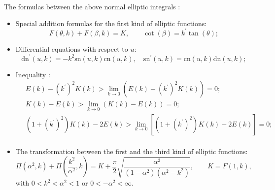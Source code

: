 \documentclass[11pt,reqno]{amsart}
\newcommand{\sn}{\mathrm{sn}}
\newcommand{\cn}{\mathrm{cn}}
\newcommand{\dn}{\mathrm{dn}}
\numberwithin{equation}{section}
\begin{document}
The formulas between the above normal elliptic integrals  \cite{ByrdF-54}:
\begin{itemize}
	\item Special addition formulas for the first kind of elliptic functions:
	\begin{equation}\label{eq:add-first}
		F(\theta,k)+F(\beta,k)=K, \qquad \cot(\beta)=k^{\prime} \tan(\theta);
	\end{equation}
	\item Differential equations with respect to $u$:
	\begin{equation}\label{eq:diff-elliptic}
		 \dn^{\prime}(u,k)=-k^2\sn(u,k)\cn(u,k),\quad
		 \sn^{\prime}(u,k)=\cn(u,k)\dn(u,k);
	\end{equation}
	\item Inequality \cite{LingS-23-mKdV-stability}:
	\begin{equation}\label{eq:inequality}
		\begin{split}
			&\ E(k) - (k^{\prime})^2 K(k)> \lim_{k\rightarrow 0} (E(k) - (k^{\prime})^2 K(k))=0;\\
			&\ K(k) - E(k)> \lim_{k\rightarrow 0} (K(k) - E(k))=0;\\
			&\  (1+(k^{\prime})^2 )K(k) -2 E(k)> \lim_{k\rightarrow 0} [(1+(k^{\prime})^2 )K(k) -2 E(k)]=0;\\
		\end{split}
	\end{equation}
	\item The transformation between the first and the third kind of elliptic functions: 
	\begin{equation}\label{eq:Pi-K-alpha}
		\Pi\left(\alpha^2,k\right)+\Pi\left(\frac{k^2}{\alpha^2},k\right)=K+\frac{\pi}{2}\sqrt{\frac{\alpha^2}{\left(1-\alpha^2\right)\left(\alpha^2-k^2\right)}},  \qquad K=F(1,k),
	\end{equation}
	with $0<k^2<\alpha^2<1$ or $0<-\alpha^2<\infty$.
\end{itemize}
\end{document}
